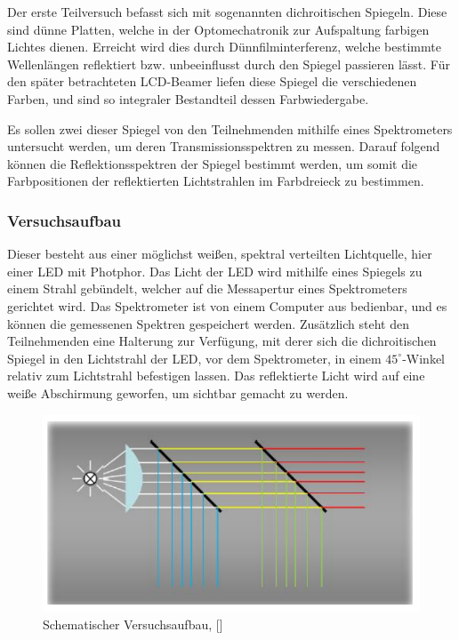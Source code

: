 
Der erste Teilversuch befasst sich mit sogenannten dichroitischen Spiegeln. Diese sind dünne Platten, welche in der Optomechatronik zur Aufspaltung farbigen Lichtes dienen. Erreicht wird dies durch Dünnfilminterferenz, welche bestimmte Wellenlängen reflektiert bzw. unbeeinflusst durch den Spiegel passieren lässt. Für den später betrachteten LCD-Beamer liefen diese Spiegel die verschiedenen Farben, und sind so integraler Bestandteil dessen Farbwiedergabe.

Es sollen zwei dieser Spiegel von den Teilnehmenden mithilfe eines Spektrometers untersucht werden, um deren Transmissionsspektren zu messen. Darauf folgend können die Reflektionsspektren der Spiegel bestimmt werden, um somit die Farbpositionen der reflektierten Lichtstrahlen im Farbdreieck zu bestimmen.

\subsubsection{Versuchsaufbau} Dieser besteht aus einer möglichst weißen, spektral verteilten Lichtquelle, hier einer LED mit Photphor. Das Licht der LED wird mithilfe eines Spiegels zu einem Strahl gebündelt, welcher auf die Messapertur eines Spektrometers gerichtet wird. Das Spektrometer ist von einem Computer aus bedienbar, und es können die gemessenen Spektren gespeichert werden. Zusätzlich steht den Teilnehmenden eine Halterung zur Verfügung, mit derer sich die dichroitischen Spiegel in den Lichtstrahl der LED, vor dem Spektrometer, in einem $45^\circ$-Winkel relativ zum Lichtstrahl befestigen lassen. Das reflektierte Licht wird auf eine weiße Abschirmung geworfen, um sichtbar gemacht zu werden.

\begin{figure}[h]
	\centering
	\includegraphics[scale=0.4]{Images/Aufbau.png}
	\caption{Schematischer Versuchsaufbau, [\cite[Abb. 3.2]{AML_SKRIPT}]}
\end{figure}

